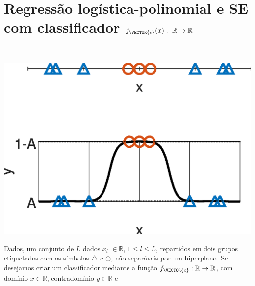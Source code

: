 \newpage

\section{Regressão logística-polinomial e SE com classificador $f_{\VECTOR{c}}(x):~\mathbb{R} \rightarrow \mathbb{R}$}
\label{sec:theo:reglogr1r1poly:1}




\begin{theorem}\label{theo:reglogr1r1poly:1}
~\\
\noindent
\begin{minipage}{0.45\textwidth}
\centering
\includegraphics[width=0.95\linewidth]{chapters/classificacao/mfiles/reglogr1r1poly/reglogr1r1poly.eps} 
\end{minipage}
\begin{minipage}{0.55\textwidth}
Dados, um conjunto de $L$ dados 
$x_l$ $\in \mathbb{R}$, $1\leq l\leq L$,
repartidos em dois grupos etiquetados com os símbolos $\bigtriangleup$ e $\bigcirc$,
não separáveis por um hiperplano.
Se desejamos criar um classificador mediante 
a função  $f_{\VECTOR{c}}:\mathbb{R} \rightarrow \mathbb{R}$,
com domínio $x \in \mathbb{R}$, contradomínio $y \in \mathbb{R}$ e 

\end{minipage}
\end{theorem}
